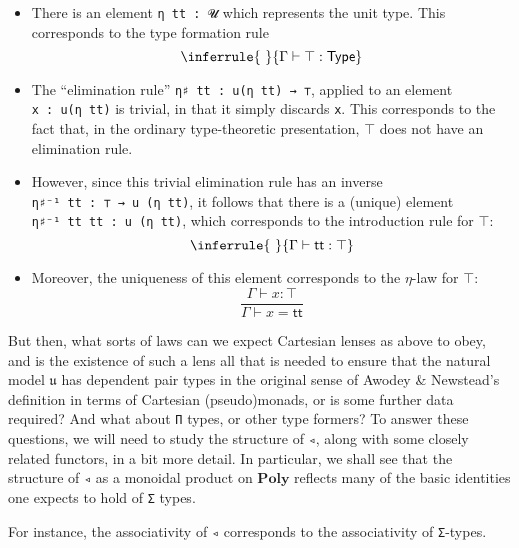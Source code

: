 \documentclass[
  11pt,
  oneside,
  article]{memoir}
\providecommand{\tightlist}{%
  \setlength{\itemsep}{0pt}\setlength{\parskip}{0pt}}
\theoremstyle{definition}
\theoremstyle{plain}
\newcommand{\Cat}[1]{\mathbf{#1}}%
\newcommand{\poly}{\Cat{Poly}}
\newcommand{\0}{\textsf{0}}
\newcommand{\1}{\tn{\textsf{1}}}
\begin{document}
\begin{itemize}
\tightlist
\item
  There is an element \texttt{η\ tt\ :\ 𝓤} which represents the unit
  type. This corresponds to the type formation rule
  \[ \inferrule{~}{\Gamma \vdash \top : \mathsf{Type}}\]
\item
  The ``elimination rule'' \texttt{η♯\ tt\ :\ u(η\ tt)\ →\ ⊤}, applied
  to an element \texttt{x\ :\ u(η\ tt)} is trivial, in that it simply
  discards \texttt{x}. This corresponds to the fact that, in the
  ordinary type-theoretic presentation, \(\top\) does not have an
  elimination rule.
\item
  However, since this trivial elimination rule has an inverse
  \texttt{η♯⁻¹\ tt\ :\ ⊤\ →\ u\ (η\ tt)}, it follows that there is a
  (unique) element \texttt{η♯⁻¹\ tt\ tt\ :\ u\ (η\ tt)}, which
  corresponds to the introduction rule for \(\top\):
  \[\inferrule{~}{\Gamma \vdash \mathsf{tt} : \top}\]
\item
  Moreover, the uniqueness of this element corresponds to the
  \(\eta\)-law for \(\top\):
  \[\frac{\Gamma \vdash x : \top}{\Gamma \vdash x = \mathsf{tt}}\]
\end{itemize}

But then, what sorts of laws can we expect Cartesian lenses as above to
obey, and is the existence of such a lens all that is needed to ensure
that the natural model \(𝔲\) has dependent pair types in the original
sense of Awodey \& Newstead's definition in terms of Cartesian
(pseudo)monads, or is some further data required? And what about
\texttt{Π} types, or other type formers? To answer these questions, we
will need to study the structure of \texttt{◃}, along with some closely
related functors, in a bit more detail. In particular, we shall see that
the structure of \texttt{◃} as a monoidal product on \(\poly\)
reflects many of the basic identities one expects to hold of \texttt{Σ}
types.

For instance, the associativity of \texttt{◃} corresponds to the
associativity of \texttt{Σ}-types.
\end{document}

